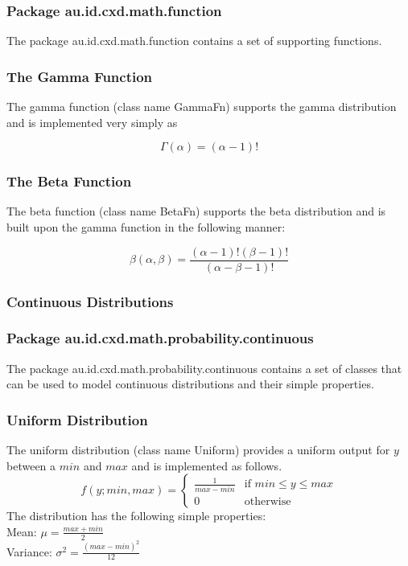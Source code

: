 \documentclass[a4paper]{article}
\begin{document}
\subsubsection*{Package au.id.cxd.math.function}

The package au.id.cxd.math.function contains a set of supporting functions. 

\subsubsection*{The Gamma Function}

The gamma function (class name GammaFn) supports the gamma distribution and is implemented very simply as 

$$\Gamma(\alpha) = (\alpha - 1)!$$

\subsubsection*{The Beta Function}

The beta function (class name BetaFn) supports the beta distribution and is built upon the gamma function in the following manner:

$$\beta(\alpha, \beta) = \frac{ (\alpha - 1)! (\beta - 1)! }{ (\alpha - \beta - 1)! }$$

\subsubsection{Continuous Distributions}

\subsubsection*{Package au.id.cxd.math.probability.continuous}

The package au.id.cxd.math.probability.continuous contains a set of classes that can be used to model continuous distributions and their simple properties.

\subsubsection*{Uniform Distribution}

The uniform distribution (class name Uniform) provides a uniform output for $y$ between a $min$ and $max$ and is implemented as follows.
\[
f(y; min, max) = 
	\begin{cases}
		\frac{1}{max - min} & \text{if } min \le y \le max \\
		0 & \text{otherwise}
		
	\end{cases}
\]
The distribution has the following simple properties:\\
Mean: $\mu = \frac{max + min}{2}$\\
Variance: $\sigma^2 = \frac{(max - min)^2}{12}$
\end{document}
